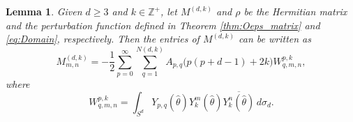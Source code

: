 \documentclass[11pt]{amsart}
\theoremstyle{definition}
\theoremstyle{plain}
\newtheorem{lemma}[definition]{Lemma}
\theoremstyle{remark}
\newcommand{\Z}{\mathbb{Z}}
\newcommand{\cc}{\overline}
\begin{document}
\begin{lemma} \label{thm:Matrix_triple}
Given $d\ge 3$ and $k\in\Z^+$, let $M^{(d, k)}$ and $\rho$ be the Hermitian matrix and the perturbation function defined in Theorem \ref{thm:Oeps_matrix} and \eqref{eq:Domain}, respectively. Then the entries of $M^{(d, k)}$ can be written as 
\begin{equation} \label{eq:Matrix_triple} 
M_{m ,n}^{(d, k)} = -\frac{1}{2}\sum_{p = 0}^\infty\sum_{q = 1}^{N(d, k)} A_{p, q}\Big(p(p + d - 1) + 2k\Big)W_{q, m, n}^{p, k}, 
\end{equation} 
where 
\begin{equation*} 
W_{q, m, n}^{p, k} = \int_{S^d} Y_{p, q}(\hat\theta)Y_k^m(\hat\theta)\cc{Y_k^n(\hat\theta)}\, d\sigma_d. 
\end{equation*} 
\end{lemma} 
\end{document}
